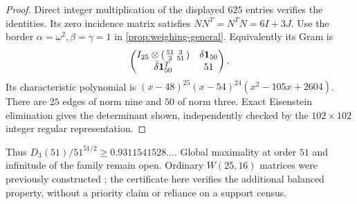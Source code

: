 \begin{proof}
Direct integer multiplication of the displayed $625$ entries verifies the identities. Its zero incidence matrix satisfies $NN^T=N^TN=6I+3J$. Use the border $\alpha=\omega^2,\beta=\gamma=1$ in \cref{prop:weighing-general}. Equivalently its Gram is
\[\begin{pmatrix}I_{25}\otimes\left(\begin{smallmatrix}51&3\\3&51\end{smallmatrix}\right)&\delta\mathbf1_{50}\\\bar\delta\mathbf1_{50}^T&51\end{pmatrix}.\]
Its characteristic polynomial is $(x-48)^{25}(x-54)^{24}(x^2-105x+2604)$. There are $25$ edges of norm nine and $50$ of norm three. Exact Eisenstein elimination gives the determinant shown, independently checked by the $102\times102$ integer regular representation.
\end{proof}
Thus $D_3(51)/51^{51/2}\ge0.9311541528\ldots$. Global maximality at order $51$ and infinitude of the family remain open. Ordinary $W(25,16)$ matrices were previously constructed \cite{BWordinary}; the certificate here verifies the additional balanced property, without a priority claim or reliance on a support census.
